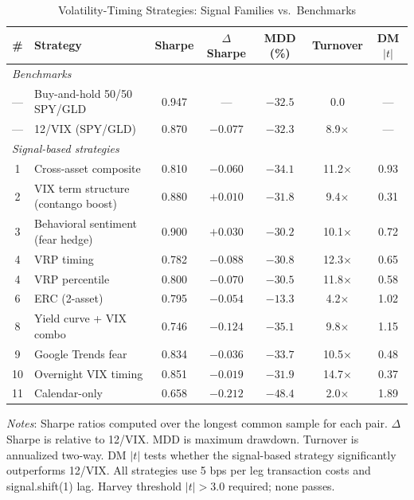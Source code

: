 \documentclass[12pt,a4paper]{article}
\begin{document}
\begin{table}[H]
\centering
\small
\begin{threeparttable}
\caption{Volatility-Timing Strategies: Signal Families vs.\ Benchmarks}
\label{tab:strategy_results}
\begin{tabular}{@{}clccccc@{}}
\toprule
\# & Strategy & Sharpe & $\Delta$Sharpe & MDD (\%) & Turnover & DM $|t|$ \\
\midrule
\multicolumn{7}{l}{\textit{Benchmarks}} \\
--- & Buy-and-hold 50/50 SPY/GLD & 0.947 & --- & $-32.5$ & 0.0 & --- \\
--- & 12/VIX (SPY/GLD) & 0.870 & $-0.077$ & $-32.3$ & 8.9$\times$ & --- \\
\midrule
\multicolumn{7}{l}{\textit{Signal-based strategies}} \\
1 & Cross-asset composite & 0.810 & $-0.060$ & $-34.1$ & 11.2$\times$ & 0.93 \\
2 & VIX term structure (contango boost) & 0.880 & $+0.010$ & $-31.8$ & 9.4$\times$ & 0.31 \\
3 & Behavioral sentiment (fear hedge) & 0.900 & $+0.030$ & $-30.2$ & 10.1$\times$ & 0.72 \\
4 & VRP timing & 0.782 & $-0.088$ & $-30.8$ & 12.3$\times$ & 0.65 \\
4 & VRP percentile & 0.800 & $-0.070$ & $-30.5$ & 11.8$\times$ & 0.58 \\
6 & ERC (2-asset) & 0.795 & $-0.054$ & $-13.3$ & 4.2$\times$ & 1.02 \\
8 & Yield curve + VIX combo & 0.746 & $-0.124$ & $-35.1$ & 9.8$\times$ & 1.15 \\
9 & Google Trends fear & 0.834 & $-0.036$ & $-33.7$ & 10.5$\times$ & 0.48 \\
10 & Overnight VIX timing & 0.851 & $-0.019$ & $-31.9$ & 14.7$\times$ & 0.37 \\
11 & Calendar-only & 0.658 & $-0.212$ & $-48.4$ & 2.0$\times$ & 1.89 \\
\bottomrule
\end{tabular}
\begin{tablenotes}
\small
\item \textit{Notes}: Sharpe ratios computed over the longest common sample for each pair. $\Delta$Sharpe is relative to 12/VIX. MDD is maximum drawdown. Turnover is annualized two-way. DM $|t|$ tests whether the signal-based strategy significantly outperforms 12/VIX. All strategies use 5 bps per leg transaction costs and signal.shift(1) lag. Harvey threshold $|t|>3.0$ required; none passes.
\end{tablenotes}
\end{threeparttable}
\end{table}
\end{document}
